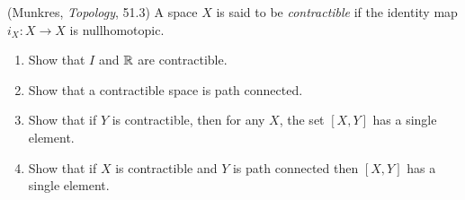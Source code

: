 \documentclass[12pt]{article}
\begin{document}
\begin{problab}{7}
(Munkres, \emph{Topology}, 51.3) A space $X$ is said to be \emph{contractible} if the identity map $i_X: X \to X$ is nullhomotopic. 
\begin{enumerate}
\item Show that $I$ and $\mathbb R$ are contractible.
\item Show that a contractible space is path connected.
\item Show that if $Y$ is contractible, then for any $X$, the set $[X,Y]$ has a single element.
\item Show that if $X$ is contractible and $Y$ is path connected then $[X,Y]$ has a single element. 
\end{enumerate}
\end{problab}
\end{document}
